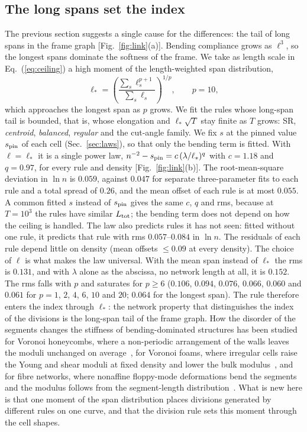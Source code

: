 \documentclass[aps,pre,twocolumn,superscriptaddress,amsmath,amssymb,floatfix]{revtex4-2}
\begin{document}
\subsection{The long spans set the index}
The previous section suggests a single cause for the differences: the tail of long spans
in the frame graph [Fig.~\ref{fig:link}(a)]. Bending compliance grows as $\ell^3$, so the
longest spans dominate the softness of the frame. We take as length scale in
Eq.~(\ref{eq:ceiling}) a high moment of the length-weighted span distribution,
\begin{equation}
\ell_*=\left(\frac{\sum_s\ell_s^{p+1}}{\sum_s\ell_s}\right)^{1/p},\qquad p=10,
\label{eq:lstar}
\end{equation}
which approaches the longest span as $p$ grows. We fit the rules whose long-span tail is
bounded, that is, whose elongation and $\ell_*\sqrt T$ stay finite as $T$ grows: SR,
\emph{centroid}, \emph{balanced}, \emph{regular} and the cut-angle family. We fix $s$ at
the pinned value $s_{\rm pin}$ of each cell (Sec.~\ref{sec:laws}), so that only the bending
term is fitted. With $\ell=\ell_*$ it is a single power law,
$n^{-2}-s_{\rm pin}=c\,(\lambda/\ell_*)^q$ with $c=1.18$ and $q=0.97$, for every rule and
density [Fig.~\ref{fig:link}(b)]. The root-mean-square deviation in $\ln n$ is $0.059$,
against $0.047$ for separate three-parameter fits to each rule and a total spread of
$0.26$, and the mean offset of each rule is at most $0.055$. A common fitted $s$ instead of
$s_{\rm pin}$ gives the same $c$, $q$ and rms, because at $T=10^3$ the rules have similar
$L_{\rm tot}$; the bending term does not depend on how the ceiling is handled. The law
also predicts rules it has not seen: fitted without one rule, it predicts that rule with
rms $0.057$--$0.084$ in $\ln n$. The residuals of each rule depend little on density
(mean offsets $\le0.09$ at every density). The choice of $\ell$ is what makes the law
universal. With the mean span instead of $\ell_*$ the rms is $0.131$, and with $\lambda$
alone as the abscissa, no network length at all, it is $0.152$. The rms falls with $p$ and
saturates for $p\ge6$ ($0.106$, $0.094$, $0.076$, $0.066$, $0.060$ and $0.061$ for
$p=1$, $2$, $4$, $6$, $10$ and $20$; $0.064$ for the longest span). The rule therefore
enters the index through $\ell_*$: the network property that distinguishes the index of
the divisions is the long-span tail of the frame graph. How the disorder of the segments changes the stiffness of
bending-dominated structures has been studied for Voronoi honeycombs, where a
non-periodic arrangement of the walls leaves the moduli unchanged on
average~\cite{silva1995}, for Voronoi foams, where irregular cells raise the Young and shear
moduli at fixed density and lower the bulk modulus~\cite{zhu2000}, and for fibre networks, where nonaffine floppy-mode deformations bend the segments and the
modulus follows from the segment-length distribution~\cite{heussinger2006,broedersz2014}. What is new
here is that one moment of the span distribution places divisions generated by different
rules on one curve, and that the division rule sets this moment through the cell shapes.
\end{document}
